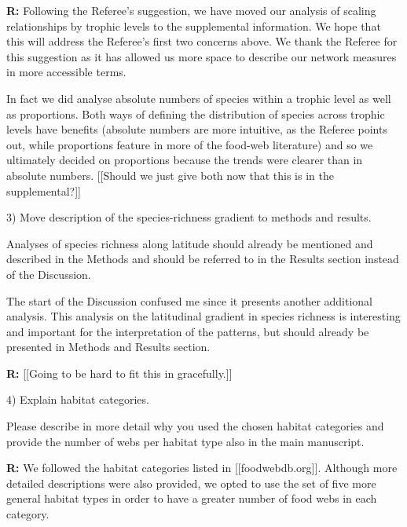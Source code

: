 \documentclass[12pt]{letter}
\newenvironment{refquote}{\bigskip \begin{it}}{\end{it}\smallskip}
\begin{document}
  \textbf{R:} Following the Referee's suggestion, we have moved our analysis
  of scaling relationships by trophic levels to the supplemental information.
  We hope that this will address the Referee's first two concerns above. We thank the
  Referee for this suggestion as it has allowed us more space to describe our network
  measures in more accessible terms.


  In fact we did analyse absolute numbers of species within a trophic level as well 
  as proportions. Both ways of defining the distribution of species across trophic levels
  have benefits (absolute numbers are more intuitive, as the Referee points out, while
  proportions feature in more of the food-web literature) and so we ultimately decided
  on proportions because the trends were clearer than in absolute numbers. [[Should we just
  give both now that this is in the supplemental?]]



  3) Move description of the species-richness gradient to methods and results.


  \begin{refquote}

     Analyses of species richness along latitude should already be mentioned
     and described in the Methods and should be referred to in the Results
     section instead of the Discussion.

     \smallskip

      The start of the Discussion confused me since it presents another
      additional analysis. This analysis on the latitudinal gradient in
      species richness is interesting and important for the interpretation of
      the patterns, but should already be presented in Methods and Results
      section.

  \end{refquote}

  \textbf{R:} [[Going to be hard to fit this in gracefully.]]


  4) Explain habitat categories.

  \begin{refquote}

    Please describe in more detail why you used the chosen habitat categories
    and provide the number of webs per habitat type also in the main
    manuscript.

  \end{refquote}


  \textbf{R:} We followed the habitat categories listed in [[foodwebdb.org]].
  Although more detailed descriptions were also    provided, we opted to use the
  set of five more general habitat types in order to have a greater number of
  food webs in each category.
\end{document}

